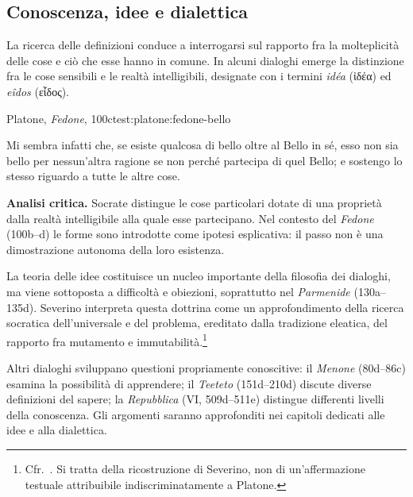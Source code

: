 \subsection{Conoscenza, idee e dialettica}

La ricerca delle definizioni conduce a interrogarsi sul rapporto fra la molteplicità delle cose e ciò che esse hanno in comune. In alcuni dialoghi emerge la distinzione fra le cose sensibili e le realtà intelligibili, designate con i termini \emph{idéa} (ἰδέα) ed \emph{eîdos} (εἶδος).

\begin{testimonianza}{Platone, \emph{Fedone}, 100c}{test:platone:fedone-bello}
\smallskip
{}\par
Mi sembra infatti che, se esiste qualcosa di bello oltre al Bello in sé, esso non sia bello per nessun'altra ragione se non perché partecipa di quel Bello; e sostengo lo stesso riguardo a tutte le altre cose.
\end{testimonianza}


\noindent\textbf{Analisi critica.}
Socrate distingue le cose particolari dotate di una proprietà dalla realtà intelligibile alla quale esse partecipano. Nel contesto del \emph{Fedone} (100b--d) le forme sono introdotte come ipotesi esplicativa: il passo non è una dimostrazione autonoma della loro esistenza.

La teoria delle idee costituisce un nucleo importante della filosofia dei dialoghi, ma viene sottoposta a difficoltà e obiezioni, soprattutto nel \emph{Parmenide} (130a--135d). Severino interpreta questa dottrina come un approfondimento della ricerca socratica dell'universale e del problema, ereditato dalla tradizione eleatica, del rapporto fra mutamento e immutabilità.\footnote{Cfr.\ \cite[121--126]{severino2010}. Si tratta della ricostruzione di Severino, non di un'affermazione testuale attribuibile indiscriminatamente a Platone.}

Altri dialoghi sviluppano questioni propriamente conoscitive: il \emph{Menone} (80d--86c) esamina la possibilità di apprendere; il \emph{Teeteto} (151d--210d) discute diverse definizioni del sapere; la \emph{Repubblica} (VI, 509d--511e) distingue differenti livelli della conoscenza. Gli argomenti saranno approfonditi nei capitoli dedicati alle idee e alla dialettica.

